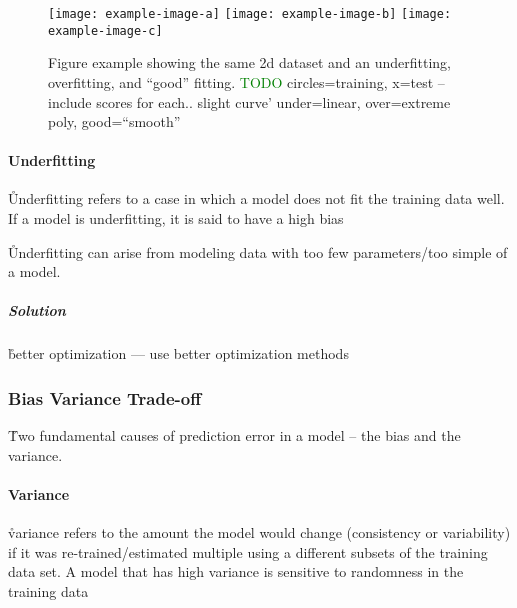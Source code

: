 
\begin{figure}[htp]
	\centering
	\texttt{[image: example-image-a]}\hfil
	\texttt{[image: example-image-b]}\hfil
	\texttt{[image: example-image-c]}\hfil
	\caption{Figure example showing the same 2d dataset and an underfitting, overfitting, and ``good'' fitting. \textcolor{green}{TODO} circles=training, x=test -- include scores for each.. slight curve' under=linear, over=extreme poly, good=``smooth''}
	\label{fig:basics_eval_fitting_examples}
\end{figure}

\paragraph{Underfitting}

\r{Underfitting refers to a case in which a model does not fit the training data well. If a model is underfitting, it is said to have a high bias}

\r{Underfitting can arise from modeling data with too few parameters/too simple of a model.}


\subparagraph{Solution}


\r{better optimization --- use better optimization methods \ALR}


\subsubsection{Bias Variance Trade-off}

\r{Two fundamental causes of prediction error in a model -- the bias and the variance.}

\paragraph{Variance}
\r{variance refers to the amount the model would change (consistency or variability) if it was re-trained/estimated multiple using a different subsets of the training data set. A model that has high variance is sensitive to randomness in the training data}

